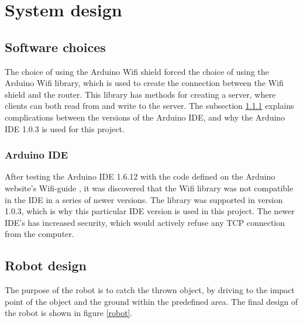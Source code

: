 \chapter{System design}
\label{chap:System design}

\section{Software choices}
\label{sec:Software choices}
The choice of using the Arduino Wifi shield forced the choice of using the Arduino Wifi library, which is used to create the connection between the Wifi shield and the router. This library has methods for creating a server, where clients can both read from and write to the server. The subsection \ref{sec:Arduino IDE} explains complications between the versions of the Arduino IDE, and why the Arduino IDE 1.0.3 is used for this project.
\subsection{Arduino IDE}
\label{sec:Arduino IDE}
After testing the Arduino IDE 1.6.12 with the code defined on the Arduino website's Wifi-guide \citep{wg}, it was discovered that the Wifi library was not compatible in the IDE in a series of newer versions. The library was supported in version 1.0.3, which is why this particular IDE version is used in this project. The newer IDE's has increased security, which would actively refuse any TCP connection from the computer.

\section{Robot design}
\label{sec:Robot design}
The purpose of the robot is to catch the thrown object, by driving to the impact point of the object and the ground within the predefined area. The final design of the robot is shown in figure \ref{robot}.

